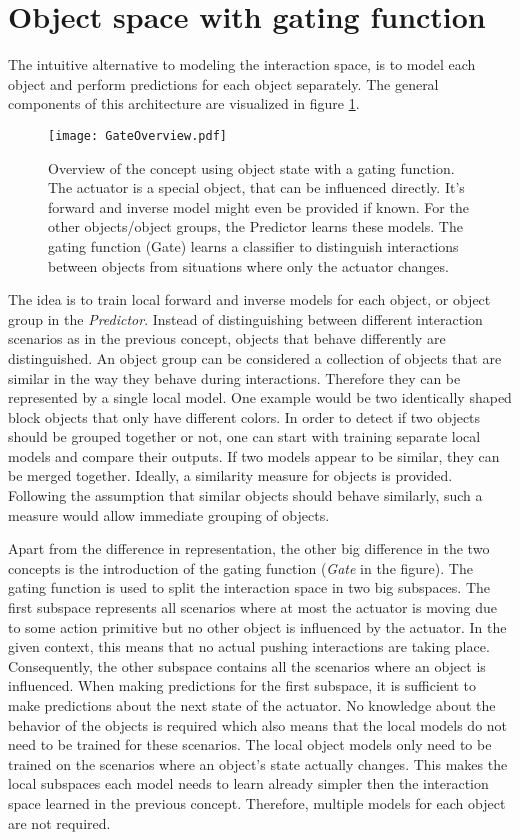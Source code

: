 \section{Object space with gating function \label{sec:gate}}

The intuitive alternative to modeling the interaction space, is to model each object and perform predictions for each object separately. 
The general components of this architecture are visualized in figure \ref{fig:GateOverview}.

\begin{figure}[h]
	\centering
	\texttt{[image: GateOverview.pdf]}
	\caption{Overview of the concept using object state with a gating function. The actuator is a special object, that can be influenced directly. It's forward and inverse model might even be provided if known. For the other objects/object groups, the Predictor learns these models. The gating function (Gate) learns a classifier to distinguish interactions between objects from situations where only the actuator changes.} 
	\label{fig:GateOverview}
\end{figure}

The idea is to train local forward and inverse models for each object, or object group in the \textit{Predictor}. 
Instead of distinguishing between different interaction scenarios as in the previous concept, objects that behave differently are distinguished. 
An object group can be considered a collection of objects that are similar in the way they behave during interactions. Therefore they can be represented by a single local model. One example would be two identically shaped block objects that only have different colors. In order to detect if two objects should be grouped together or not, one can start with training separate local models and compare their outputs. If two models appear to be similar, they can be merged together. Ideally, a similarity measure for objects is provided. Following the assumption that similar objects should behave similarly, such a measure would allow immediate grouping of objects.

Apart from the difference in representation, the other big difference in the two concepts is the introduction of the gating function (\textit{Gate} in the figure). The gating function is used to split the interaction space in two big subspaces. The first subspace represents all scenarios where at most the actuator is moving due to some action primitive but no other object is influenced by the actuator. In the given context, this means that no actual pushing interactions are taking place.  Consequently, the other subspace contains all the scenarios where an object is influenced. When making predictions for the first subspace, it is sufficient to make predictions about the next state of the actuator. No knowledge about the behavior of the objects is required which also means that the local models do not need to be trained for these scenarios. The local object models only need to be trained on the scenarios where an object's state actually changes. 
This makes the local subspaces each model needs to learn already simpler then the interaction space learned in the previous concept. Therefore, multiple models for each object are not required.

